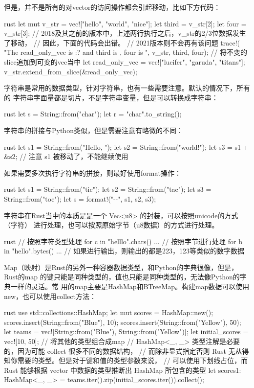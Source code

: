 但是，并不是所有的对vector的访问操作都会引起移动，比如下方代码：
\begin{code-block}{rust}
let mut v_str = vec!["hello", "world", "nice"];
let third = v_str[2];
let four = v_str[3];
// 2018及其之前的版本中，上述两行执行之后，v_str的2/3位数据发生了移动，
// 因此，下面的代码会出错。
// 2021版本则不会再有该问题
trace!(
    "The read_only_vec is {:?} and third is {}, four is {}",
    v_str, third, four);
// 将不变的slice追加到可变的vec当中
let read_only_vec = vec!["lucifer", "garuda", "titans"];
v_str.extend_from_slice(&read_only_vec);
\end{code-block}

字符串是常用的数据类型，针对字符串，也有一些需要注意。默认的情况下，所有的
字符串字面量都是切片，不是字符串变量，但是可以转换成字符串：
\begin{code-block}{rust}
let s = String::from("char");
let r = "char".to_string();
\end{code-block}

字符串的拼接与Python类似，但是需要注意有略微的不同：
\begin{code-block}{rust}
let s1 = String::from("Hello, ");
let s2 = String::from("world!");
let s3 = s1 + &s2; // 注意 s1 被移动了，不能继续使用
\end{code-block}

如果需要多次执行字符串的拼接，则最好使用format操作：
\begin{code-block}{rust}
let s1 = String::from("tic");
let s2 = String::from("tac");
let s3 = String::from("toe");
let s = format!("{}-{}-{}", s1, s2, s3);
\end{code-block}

字符串在Rust当中的本质是是一个 Vec<u8> 的封装，可以按照unicode的方式（字符）
进行处理，也可以按照原始字节（u8数据）的方式进行处理。
\begin{code-block}{rust}
// 按照字符类型处理
for c in "helllo".chars() {
    ...
}
// 按照字节进行处理
for b in "hello".bytes() {
    ... // 如果进行输出，则输出的都是223，123等类似的数字数据
}
\end{code-block}

Map（映射）是Rust的另外一种容器数据类型，和Python的字典很像，但是，Rust的map
的键只能是同种类型的，值也只能是同种类型的，无法像Python的字典一样的灵活。常
用的map主要是HashMap和BTreeMap。构建map数据可以使用new，也可以使用collect方法：
\begin{code-block}{rust}
use std::collections::HashMap;
let mut scores = HashMap::new();
scores.insert(String::from("Blue"), 10);
scores.insert(String::from("Yellow"), 50);
let teams  = vec![String::from("Blue"), String::from("Yellow")];
let initial_scores = vec![10, 50];
// 将其他的类型组合成map
// HashMap<_, _> 类型注解是必要的，因为可能 collect 很多不同的数据结构，
// 而除非显式指定否则 Rust 无从得知你需要的类型。但是对于键和值的类型参数来说，
// 可以使用下划线占位，而 Rust 能够根据 vector 中数据的类型推断出 HashMap 所包含的类型
let scores1: HashMap<_, _> = teams.iter().zip(initial_scores.iter()).collect();
\end{code-block}

